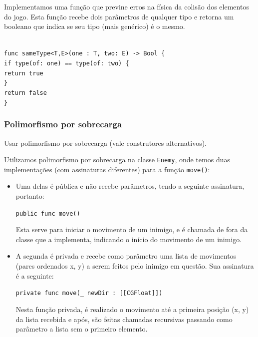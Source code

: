 \documentclass[rel_mlp]{iiufrgs}
\newcommand\tab[1][1cm]{\hspace*{#1}}
\begin{document}
Implementamos uma função que previne erros na física da colisão dos elementos do jogo. Esta função recebe dois parâmetros de qualquer tipo e retorna um booleano que indica se seu tipo (mais genérico) é o mesmo.

\texttt{\\func sameType<T,E>(one : T, two: E) -> Bool \{\\\tab if type(of: one) == type(of: two) \{\\\tab \tab return true\\\tab\}\\\tab return false\\\}}



\subsubsection{Polimorfismo por sobrecarga}

Usar polimorfismo por sobrecarga (vale construtores alternativos).

Utilizamos polimorfismo por sobrecarga na classe \texttt{Enemy}, onde temos duas implementações (com assinaturas diferentes) para a função \texttt{move()}:

\begin{itemize}
\setlength{\itemindent}{1em}
    \item Uma delas é pública e não recebe parâmetros, tendo a seguinte assinatura, portanto:
    
    \texttt{public func move()}
    
    Esta serve para iniciar o movimento de um inimigo, e é chamada de fora da classe que a implementa, indicando o início do movimento de um inimigo.
    
    \item A segunda é privada e recebe como parâmetro uma lista de movimentos (pares ordenados x, y) a serem feitos pelo inimigo em questão. Sua assinatura é a seguinte:
    
    \texttt{private func move(\_ newDir : [[CGFloat]])}
    
    Nesta função privada, é realizado o movimento até a primeira posição (x, y) da lista recebida e após, são feitas chamadas recursivas passando como parâmetro a lista sem o primeiro elemento.
\end{itemize}
\end{document}
